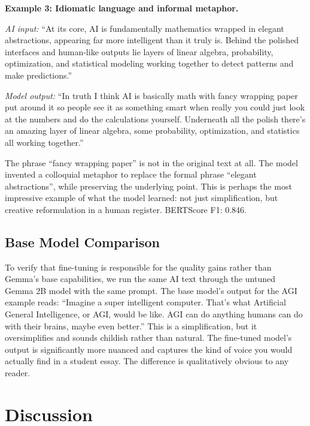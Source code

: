 \documentclass{article}
\begin{document}
\textbf{Example 3: Idiomatic language and informal metaphor.}

\textit{AI input:} ``At its core, AI is fundamentally mathematics wrapped in elegant abstractions, appearing far more intelligent than it truly is. Behind the polished interfaces and human-like outputs lie layers of linear algebra, probability, optimization, and statistical modeling working together to detect patterns and make predictions.''

\textit{Model output:} ``In truth I think AI is basically math with fancy wrapping paper put around it so people see it as something smart when really you could just look at the numbers and do the calculations yourself. Underneath all the polish there's an amazing layer of linear algebra, some probability, optimization, and statistics all working together.''

The phrase ``fancy wrapping paper'' is not in the original text at all. The model invented a colloquial metaphor to replace the formal phrase ``elegant abstractions'', while preserving the underlying point. This is perhaps the most impressive example of what the model learned: not just simplification, but creative reformulation in a human register. BERTScore F1: 0.846.

\subsection{Base Model Comparison}

To verify that fine-tuning is responsible for the quality gains rather than Gemma's base capabilities, we run the same AI text through the untuned Gemma 2B model with the same prompt. The base model's output for the AGI example reads: ``Imagine a super intelligent computer. That's what Artificial General Intelligence, or AGI, would be like. AGI can do anything humans can do with their brains, maybe even better.'' This is a simplification, but it oversimplifies and sounds childish rather than natural. The fine-tuned model's output is significantly more nuanced and captures the kind of voice you would actually find in a student essay. The difference is qualitatively obvious to any reader.

\section{Discussion}
\end{document}
